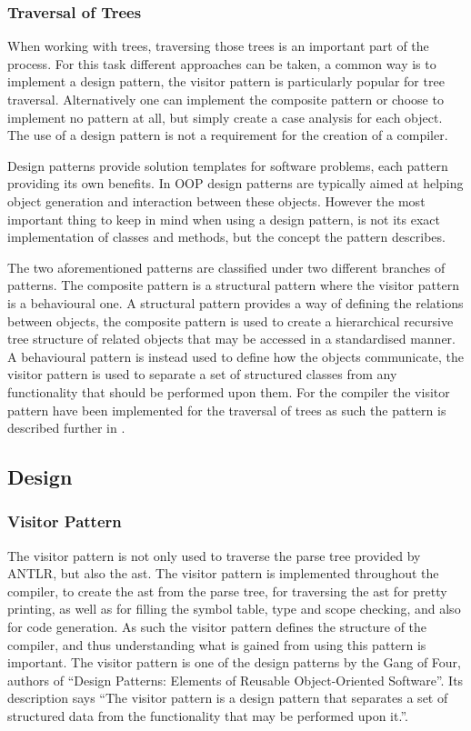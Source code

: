 \subsubsection*{Traversal of Trees}
When working with trees, traversing those trees is an important part of the process.
For this task different approaches can be taken, a common way is to implement a design pattern, the visitor pattern is particularly popular for tree traversal.
Alternatively one can implement the composite pattern or choose to implement no pattern at all, but simply create a case analysis for each object.
The use of a design pattern is not a requirement for the creation of a compiler.

Design patterns provide solution templates for software problems, each pattern providing its own benefits.
In OOP design patterns are typically aimed at helping object generation and interaction between these objects.
However the most important thing to keep in mind when using a design pattern, is not its exact implementation of classes and methods, but the concept the pattern describes.

The two aforementioned patterns are classified under two different branches of patterns.
The composite pattern is a structural pattern where the visitor pattern is a behavioural one.
A structural pattern provides a way of defining the relations between objects, the composite pattern is used to create a hierarchical recursive tree structure of related objects that may be accessed in a standardised manner.
A behavioural pattern is instead used to define how the objects communicate, the visitor pattern is used to separate a set of structured classes from any functionality that should be performed upon them.
For the compiler the visitor pattern have been implemented for the traversal of trees as such the pattern is described further in .  

\subsection{Design}
\subsubsection*{Visitor Pattern}\label{subs:visit}
The visitor pattern is not only used to traverse the parse tree provided by ANTLR, but also the \acrfull{ast}.
The visitor pattern is implemented throughout the compiler, to create the \acrfull{ast} from the parse tree, for traversing the \acrfull{ast} for pretty printing, as well as for filling the symbol table, type and scope checking, and also for code generation.
As such the visitor pattern defines the structure of the compiler, and thus understanding what is gained from using this pattern is important.
The visitor pattern is one of the design patterns by the Gang of Four, authors of ``Design Patterns: Elements of Reusable Object-Oriented Software''.
Its description says ``The visitor pattern is a design pattern that separates a set of structured data from the functionality that may be performed upon it.''. \citep{GOF}

